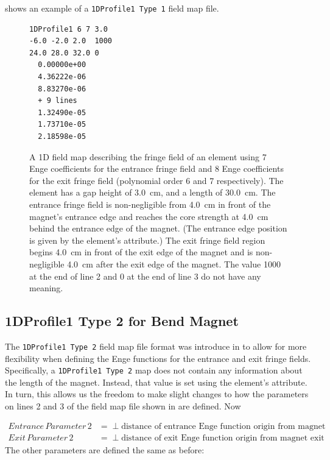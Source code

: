  shows an example of a \texttt{1DProfile1 Type 1} field map file.

\begin{figure}[ht]
  \begin{fmpage}
\begin{verbatim}
1DProfile1 6 7 3.0
-6.0 -2.0 2.0  1000
24.0 28.0 32.0 0
  0.00000e+00
  4.36222e-06
  8.83270e-06
  + 9 lines
  1.32490e-05
  1.73710e-05
  2.18598e-05
\end{verbatim}
  \end{fmpage}
  \caption[Example of a 1DProfile1 Type 1 field map]{A 1D field map describing the fringe field of an element using
    7 Enge coefficients for the entrance fringe field and 8 Enge coefficients for the exit fringe field (polynomial
    order 6 and 7 respectively). The element has a gap height of \SI{3.0}{\centi\meter}, and a length of \SI{30.0}{\centi\meter}. The entrance
    fringe field is non-negligible from \SI{4.0}{\centi\meter} in front of the magnet's entrance edge and reaches the core strength
    at \SI{4.0}{\centi\meter} behind the entrance edge of the magnet. (The entrance edge position is given by the element's
     attribute.) The exit fringe field region begins \SI{4.0}{\centi\meter} in front of the exit edge of the magnet and is non-negligible \SI{4.0}{\centi\meter} after the exit edge of the magnet. The value 1000 at the end of line 2 and 0 at the end of line 3 do not have any meaning.}
  \label{fig:1DProfile1Type1}
\end{figure}


\subsection{1DProfile1 Type 2 for Bend Magnet}
\label{ssec:1DProfile1Type2}
The \texttt{1DProfile1 Type 2} field map file format was introduce in \opal {} to allow for more flexibility
when defining the Enge functions for the entrance and exit fringe fields. Specifically, a \texttt{1DProfile1 Type 2} map
does not contain any information about the length of the magnet. Instead, that value is set using the element's
 attribute. In turn, this allows us the freedom to make slight changes to how the parameters on lines 2
and 3 of the field map file shown in  are defined. Now

\begin{align*}
  Entrance\,Parameter\,2 &= \perp \text{distance of entrance Enge function origin from magnet entrance edge} \\
  Exit\,Parameter\,2 &= \perp \text{distance of exit Enge function origin from magnet exit edge}
\end{align*}
The other parameters are defined the same as before:

